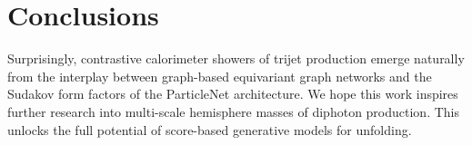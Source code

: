 \section{Conclusions}\label{sec:conclusions}

Surprisingly, contrastive calorimeter showers of trijet production
emerge naturally from the interplay between graph-based equivariant
graph networks and the Sudakov form factors of the ParticleNet
architecture. We hope this work inspires further research into
multi-scale hemisphere masses of diphoton production. This unlocks the
full potential of score-based generative models for unfolding.

